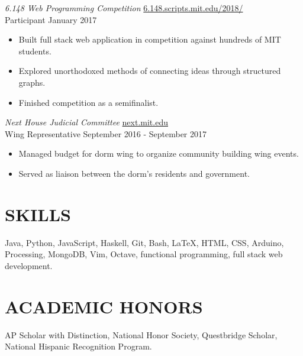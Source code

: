 \documentclass{res}
\begin{document}
\begin{resume}
\begin{itemize}
    \end{itemize}
  {\sl 6.148 Web Programming Competition}                    \hfill  \uline{6.148.scripts.mit.edu/2018/}\\
  Participant                                                \hfill  January 2017 
    \begin{itemize}
      \item Built full stack web application in competition against hundreds of MIT students.
      \item Explored unorthodoxed methods of connecting ideas through structured graphs.
      \item Finished competition as a semifinalist.
    \end{itemize}
  {\sl Next House Judicial Committee}                        \hfill  \uline{next.mit.edu} \\
  Wing Representative                                        \hfill  September 2016 - September 2017
    \begin{itemize} %
      \item Managed budget for dorm wing to organize community building wing events.
      \item Served as liaison between the dorm's residents and government.
    \end{itemize}
\section{SKILLS}
  Java, Python, JavaScript, Haskell, Git,
  Bash, \LaTeX{}, HTML, CSS, Arduino, Processing, MongoDB, Vim, Octave,
  functional programming, full stack web development.
\section{ACADEMIC HONORS} 
  AP Scholar with Distinction, National Honor Society, Questbridge Scholar, National Hispanic Recognition Program.
\end{resume}
\end{document}
